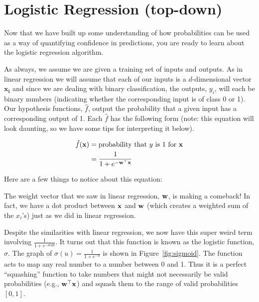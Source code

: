 \documentclass[assignment03_Solutions]{subfiles}
\begin{document}
\section{Logistic Regression (top-down)}
Now that we have built up some understanding of how probabilities can be used as a way of quantifying confidence in predictions, you are ready to learn about the logistic regression algorithm.

As always, we assume we are given a training set of inputs and outputs.  As in linear regression we will assume that each of our inputs is a $d$-dimensional vector $\mathbf{x_i}$ and since we are dealing with binary classification, the outputs, $y_i$, will each be binary numbers (indicating whether the corresponding input is of class 0 or 1).  Our hypothesis functions, $\hat{f}$, output the probability that a given input has a corresponding output of 1.  Each $\hat{f}$ has the following form (note: this equation will look daunting, so we have some tips for interpreting it below).

\begin{align}
\hat{f}(\mathbf{x}) &= \mbox{probability that $y$ is 1 for $\mathbf{x}$} \nonumber \\
&=\frac{1}{1 + e^{-\mathbf{w}^\top \mathbf{x}}}
\end{align}

Here are a few things to notice about this equation:
\be
\item The weight vector that we saw in linear regression, $\mathbf{w}$, is making a comeback!  In fact, we have a dot product between $\mathbf{x}$ and $\mathbf{w}$ (which creates a weighted sum of the $x_i$'s) just as we did in linear regression.
\item Despite the similarities with linear regression, we now have this super weird term involving $\frac{1}{1+e^{-\mbox{stuff}}}$.  It turns out that this function is known as the logistic function, $\sigma$.  The graph of $\sigma(u) = \frac{1}{1+e^{-u}}$ is shown in Figure~\ref{fig:sigmoid}.  The function acts to map any real number to a number between 0 and 1.  Thus it is a perfect ``squashing'' function to take numbers that might not necessarily be valid probabilities (e.g., $\mathbf{w}^\top \mathbf{x}$) and squash them to the range of valid probabilities $[0,1]$.
\end{document}
